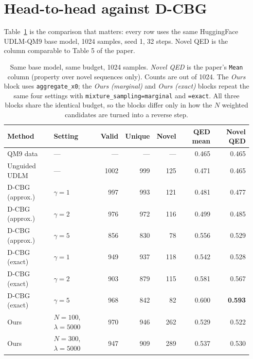 \documentclass[11pt]{article}
\begin{document}
\section{Head-to-head against D-CBG}
\label{sec:headline}

Table~\ref{tab:headline} is the comparison that matters: every row uses the
same HuggingFace UDLM-QM9 base model, 1024 samples, seed 1, 32 steps. Novel QED
is the column comparable to Table 5 of the paper.

\begin{table}[h]
\centering
\caption{Same base model, same budget, 1024 samples. \emph{Novel QED} is the
paper's \texttt{Mean} column (property over novel sequences only). Counts are
out of 1024. The \emph{Ours} block uses \texttt{aggregate\_x0}; the
\emph{Ours (marginal)} and \emph{Ours (exact)} blocks repeat the same four
settings with \texttt{mixture\_sampling=marginal} and \texttt{=exact}. All three
blocks share the identical budget, so the blocks differ only in how the $N$
weighted candidates are turned into a reverse step.}
\label{tab:headline}
\begin{tabular}{llrrrrr}
\toprule
Method & Setting & Valid & Unique & Novel & QED mean & Novel QED \\
\midrule
QM9 data          & ---                              & --- & --- & --- & 0.465 & 0.465 \\
Unguided UDLM     & ---                              & 1002 & 999 & 125 & 0.471 & 0.465 \\
\midrule
D-CBG (approx.)   & $\gamma = 1$                     & 997 & 993 & 121 & 0.481 & 0.477 \\
D-CBG (approx.)   & $\gamma = 2$                     & 976 & 972 & 116 & 0.499 & 0.485 \\
D-CBG (approx.)   & $\gamma = 5$                     & 856 & 830 & 78  & 0.556 & 0.529 \\
\midrule
D-CBG (exact)     & $\gamma = 1$                     & 949 & 937 & 118 & 0.542 & 0.528 \\
D-CBG (exact)     & $\gamma = 2$                     & 903 & 879 & 115 & 0.581 & 0.567 \\
D-CBG (exact)     & $\gamma = 5$                     & 968 & 842 & 82  & 0.600 & \textbf{0.593} \\
\midrule
Ours              & $N{=}100$, $\lambda{=}5000$      & 970 & 946 & 262 & 0.529 & 0.522 \\
Ours              & $N{=}300$, $\lambda{=}5000$      & 947 & 909 & 289 & 0.537 & 0.530 \\

\end{tabular}
\end{table}
\end{document}
